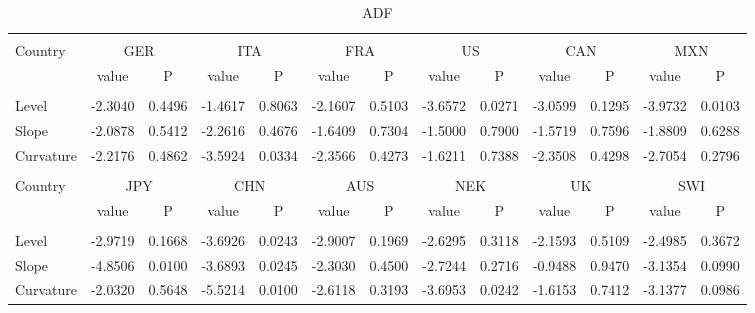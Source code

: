 \documentclass{article}
\begin{document}
\begin{table}[h]
\caption{ADF} %
\fontsize{10}{10}\selectfont
\centering%
\begin{tabular}{l cc cc cc cc cc cc}%
\hline\hline \\ [-1.5ex]                         %

Country	&	\multicolumn{2}{c}{GER}			&	\multicolumn{2}{c}{ITA}			&	\multicolumn{2}{c}{FRA}			&	\multicolumn{2}{c}{US}			&	\multicolumn{2}{c}{CAN}			&	\multicolumn{2}{c}{MXN}			\\[0.5ex] 

 & value &P & value &P& value &P & value &P& value &P & value &P\\

\hline       \\ [-1.5ex] 

Level	&	-2.3040	&	0.4496	&	-1.4617	&	0.8063	&	-2.1607	&	0.5103	&	-3.6572	&	0.0271	&	-3.0599	&	0.1295	&	-3.9732	&	0.0103	\\
Slope	&	-2.0878	&	0.5412	&	-2.2616	&	0.4676	&	-1.6409	&	0.7304	&	-1.5000	&	0.7900	&	-1.5719	&	0.7596	&	-1.8809	&	0.6288	\\
\medskip
Curvature	&	-2.2176	&	0.4862	&	-3.5924	&	0.0334	&	-2.3566	&	0.4273	&	-1.6211	&	0.7388	&	-2.3508	&	0.4298	&	-2.7054	&	0.2796	\\

\hline\hline   \\ [-1.5ex]    

Country	&	\multicolumn{2}{c}{JPY}			&	\multicolumn{2}{c}{CHN}			&	\multicolumn{2}{c}{AUS}			&	\multicolumn{2}{c}{NEK}			&	\multicolumn{2}{c}{UK}			&	\multicolumn{2}{c}{SWI}			\\

 & value &P & value &P& value &P & value &P& value &P & value &P\\

\hline       \\ [-1.5ex] 

Level	&	-2.9719	&	0.1668	&	-3.6926	&	0.0243	&	-2.9007	&	0.1969	&	-2.6295	&	0.3118	&	-2.1593	&	0.5109	&	-2.4985	&	0.3672	\\
Slope	&	-4.8506	&	0.0100	&	-3.6893	&	0.0245	&	-2.3030	&	0.4500	&	-2.7244	&	0.2716	&	-0.9488	&	0.9470	&	-3.1354	&	0.0990	\\
Curvature	&	-2.0320	&	0.5648	&	-5.5214	&	0.0100	&	-2.6118	&	0.3193	&	-3.6953	&	0.0242	&	-1.6153	&	0.7412	&	-3.1377	&	0.0986	\\

\hline            
\end{tabular}
\label{table:nonlin}%
\end{table}
\end{document}

